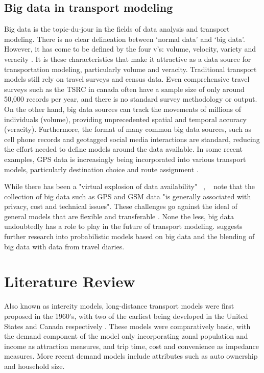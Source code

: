 \section{Big data in transport modeling}
Big data is the topic-du-jour in the fields of data analysis and transport modeling. There is no clear delineation between `normal data' and `big data'. However, it has come to be defined by the four v's: volume, velocity, variety and veracity \parencite{beyer2012importance}. It is these characteristics that make it attractive as a data source for transportation modeling, particularly volume and veracity. Traditional transport models still rely on travel surveys and census data. Even comprehensive travel surveys such as the TSRC in canada  often have a sample size of only around 50,000 records per year, and there is no standard survey methodology or output. On the other hand, big data sources can track the movements of millions of individuals (volume), providing unprecedented spatial and temporal accuracy (veracity). Furthermore, the format of many common big data sources, such as cell phone records and geotagged social media interactions are standard, reducing the effort needed to define models around the data available. In some recent examples, GPS data is increasingly being incorporated into various transport models, particularly destination choice \parencite{schonfelder2006analysis, pan2006cellular} and route assignment \parencite{broach2012cyclists, menghini2010route}.

While there has been a "virtual explosion of data availability" ~\textcite{nagel2001workshop},  ~\textcite{horni2012improve} note that  the collection of big data such as GPS and GSM data "is generally associated with privacy, cost and technical issues".  These challenges go against the ideal of general models that are flexible and transferable \parencite{patriksson2015traffic}. None the less, big data undoubtedly has a role to play in the future of transport modeling. \textcite{rth2015} suggests further research into probabilistic models based on big data and the blending of big data with data from travel diaries. 

\chapter{Literature Review}
\label{section:lit-review}
Also known as intercity models, long-distance transport models were first proposed in the 1960’s, with two of the earliest being developed in the United States and Canada respectively \parencite{CTC71}. These models were comparatively basic, with the demand component of the model only incorporating zonal population and income as attraction measures, and trip time, cost and convenience as impedance measures. More recent demand models include attributes such as auto ownership and household size. 


